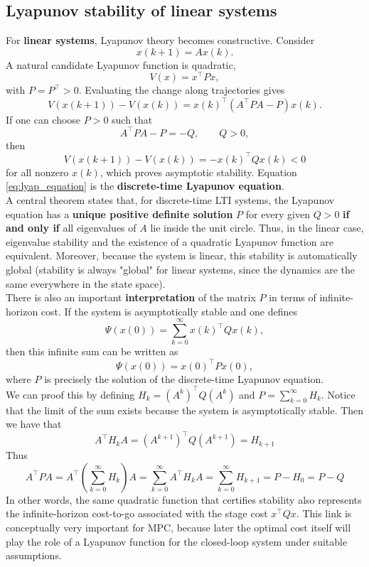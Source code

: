 \subsection{Lyapunov stability of linear systems}

For \textbf{linear systems}, Lyapunov theory becomes constructive. Consider
\[
x(k+1)=Ax(k).
\]
A natural candidate Lyapunov function is quadratic,
\[
V(x)=x^\top P x,
\]
with $P=P^\top>0$. Evaluating the change along trajectories gives
\[
V(x(k+1))-V(x(k))
= x(k)^\top(A^\top P A - P)x(k).
\]
If one can choose $P>0$ such that
\begin{equation}
A^\top P A - P = -Q,
\qquad Q>0,
\label{eq:lyap_equation}
\end{equation}
then
\[
V(x(k+1))-V(x(k)) = -x(k)^\top Q x(k) < 0
\]
for all nonzero $x(k)$, which proves asymptotic stability. Equation \eqref{eq:lyap_equation} is the \textbf{discrete-time Lyapunov equation}.\\

A central theorem states that, for discrete-time LTI systems, the Lyapunov equation has a \textbf{unique positive definite solution} $P$ for every given $Q>0$ \textbf{if and only if} all eigenvalues of $A$ lie inside the unit circle. Thus, in the linear case, eigenvalue stability and the existence of a quadratic Lyapunov function are equivalent. Moreover, because the system is linear, this stability is automatically global (stability is always "global" for linear systems, since the dynamics are the same everywhere in the state space).\\

There is also an important \textbf{interpretation} of the matrix $P$ in terms of infinite-horizon cost. If the system is asymptotically stable and one defines
\[
\Psi(x(0))=\sum_{k=0}^{\infty} x(k)^\top Q x(k),
\]
then this infinite sum can be written as
\[
\Psi(x(0)) = x(0)^\top P x(0),
\]
where $P$ is precisely the solution of the discrete-time Lyapunov equation.\\
We can proof this by defining $H_k = (A^k)^\top Q (A^k)$ and $P = \sum_{k=0}^\infty H_k$. Notice that the limit of the sum exists because the system is asymptotically stable. Then we have that
$$A^\top H_k A = (A^{k+1})^\top Q (A^{k+1}) = H_{k+1}$$
Thus 
$$ A^\top P A = A^\top \left(\sum_{k=0}^\infty H_k\right) A = \sum_{k=0}^\infty A^\top H_k A = \sum_{k=0}^\infty H_{k+1} = P - H_0 = P- Q$$
In other words, the same quadratic function that certifies stability also represents the infinite-horizon cost-to-go associated with the stage cost $x^\top Qx$. This link is conceptually very important for MPC, because later the optimal cost itself will play the role of a Lyapunov function for the closed-loop system under suitable assumptions.

